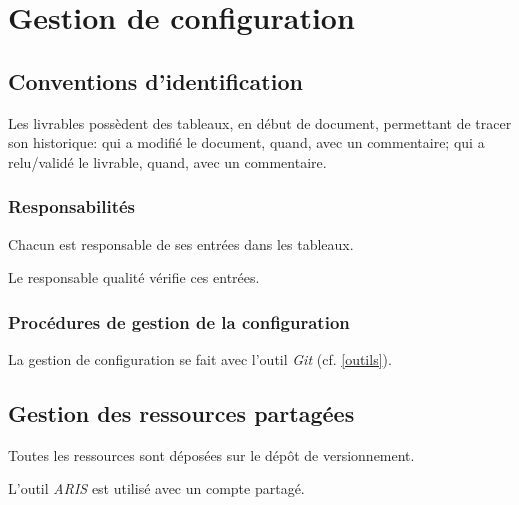 \section{Gestion de configuration}

\subsection{Conventions d'identification}
Les livrables possèdent des tableaux, en début de document, permettant
de tracer son historique: qui a modifié le document, quand, avec un
commentaire; qui a relu/validé le livrable, quand, avec un commentaire.

\subsubsection{Responsabilités}
Chacun est responsable de ses entrées dans les tableaux.

Le responsable qualité vérifie ces entrées.

\subsubsection{Procédures de gestion de la configuration}
La gestion de configuration se fait avec l'outil \textsl{Git} (cf. \ref{outils}).

\subsection{Gestion des ressources partagées}
Toutes les ressources sont déposées sur le dépôt de versionnement.

L'outil \textsl{ARIS} est utilisé avec un compte partagé.
